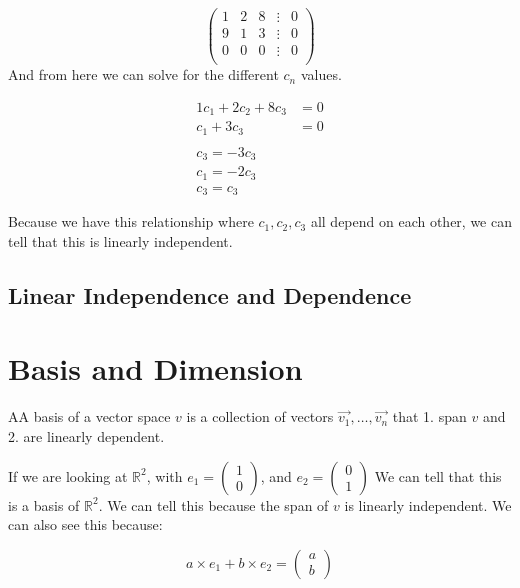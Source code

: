 \begin{problem}
    \begin{equation}
      \begin{pmatrix}
        1&2&8&\vdots&0\\
        9&1&3&\vdots&0\\
        0&0&0&\vdots&0\\
      \end{pmatrix}
    \end{equation}
    And from here we can solve for the different $c_n$ values.

    \begin{align}
      1c_1+2c_2+8c_3&=0\\
      c_1+3c_3&=0\\\\
      c_3=-3c_3\\
      c_1=-2c_3\\
      c_3=c_3  
    \end{align}

    Because we have this relationship where $c_1,c_2,c_3$ all depend on each other, we can tell that this is linearly independent.
  \end{problem}

  \subsection{Linear Independence and Dependence}
  
\section{Basis and Dimension}
  \begin{definition}
    AA basis of a vector space $v$ is a collection of vectors $\vec{v_1},\dots,\vec{v_n}$ that 1. span $v$ and 2. are linearly dependent.
  \end{definition}

  \begin{problem}
    If we are looking at $\mathbb{R}^2$, with $e_1=\left(\begin{smallmatrix}1\\0\end{smallmatrix}\right)$, and $e_2=\left(\begin{smallmatrix}0\\1\end{smallmatrix}\right)$
    We can tell that this is a basis of $\mathbb{R}^2$. We can tell this because the span of $v$ is linearly independent. We can also see this because:

    \begin{equation}
      a\times e_1+b\times e_2=\begin{pmatrix}a\\b\end{pmatrix}
    \end{equation}
  \end{problem}

